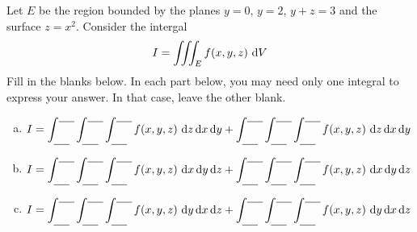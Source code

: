 \begin{question}[M200 2016D] %
Let $E$ be the region bounded by the planes $y=0$, $y=2$,
$y+z=3$ and the surface $z=x^2$. Consider the intergal
\begin{align*}
I=\iiint_E f(x,y,z)\ \mathrm{d}V
\end{align*}
Fill in the blanks below. In each part below,
you may need only one integral to express your answer. In that
case, leave the other blank.

\begin{enumerate}[(a)]
\item
$\displaystyle I=\int_{\underline{\ \ \ \ }}^{\underline{\ \ \ \ }}
                 \int_{\underline{\ \ \ \ }}^{\underline{\ \ \ \ }}
                 \int_{\underline{\ \ \ \ }}^{\underline{\ \ \ \ }}
                        f(x,y,z)\ \dee{z}\,\dee{x}\,\dee{y} +
                 \int_{\underline{\ \ \ \ }}^{\underline{\ \ \ \ }}
                 \int_{\underline{\ \ \ \ }}^{\underline{\ \ \ \ }}
                 \int_{\underline{\ \ \ \ }}^{\underline{\ \ \ \ }}
                        f(x,y,z)\ \dee{z}\,\dee{x}\,\dee{y} $
\medskip
\item
$\displaystyle I=\int_{\underline{\ \ \ \ }}^{\underline{\ \ \ \ }}
                 \int_{\underline{\ \ \ \ }}^{\underline{\ \ \ \ }}
                 \int_{\underline{\ \ \ \ }}^{\underline{\ \ \ \ }}
                        f(x,y,z)\ \dee{x}\,\dee{y}\,\dee{z} +
                 \int_{\underline{\ \ \ \ }}^{\underline{\ \ \ \ }}
                 \int_{\underline{\ \ \ \ }}^{\underline{\ \ \ \ }}
                 \int_{\underline{\ \ \ \ }}^{\underline{\ \ \ \ }}
                        f(x,y,z)\ \dee{x}\,\dee{y}\,\dee{z} $
\medskip
\item
$\displaystyle I=\int_{\underline{\ \ \ \ }}^{\underline{\ \ \ \ }}
                 \int_{\underline{\ \ \ \ }}^{\underline{\ \ \ \ }}
                 \int_{\underline{\ \ \ \ }}^{\underline{\ \ \ \ }}
                        f(x,y,z)\ \dee{y}\,\dee{x}\,\dee{z} +
                 \int_{\underline{\ \ \ \ }}^{\underline{\ \ \ \ }}
                 \int_{\underline{\ \ \ \ }}^{\underline{\ \ \ \ }}
                 \int_{\underline{\ \ \ \ }}^{\underline{\ \ \ \ }}
                        f(x,y,z)\ \dee{y}\,\dee{x}\,\dee{z} $

\end{enumerate}
\end{question}

%

